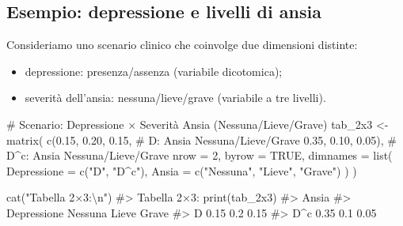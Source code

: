 \documentclass[
  letterpaper,
  DIV=11,
  numbers=noendperiod,
  oneside]{scrreprt}
\newenvironment{Shaded}{\begin{snugshade}}{\end{snugshade}}
\newcommand{\AttributeTok}[1]{\textcolor[rgb]{0.40,0.45,0.13}{#1}}
\newcommand{\CommentTok}[1]{\textcolor[rgb]{0.37,0.37,0.37}{#1}}
\newcommand{\ConstantTok}[1]{\textcolor[rgb]{0.56,0.35,0.01}{#1}}
\newcommand{\DecValTok}[1]{\textcolor[rgb]{0.68,0.00,0.00}{#1}}
\newcommand{\FloatTok}[1]{\textcolor[rgb]{0.68,0.00,0.00}{#1}}
\newcommand{\FunctionTok}[1]{\textcolor[rgb]{0.28,0.35,0.67}{#1}}
\newcommand{\NormalTok}[1]{\textcolor[rgb]{0.00,0.23,0.31}{#1}}
\newcommand{\OtherTok}[1]{\textcolor[rgb]{0.00,0.23,0.31}{#1}}
\newcommand{\SpecialCharTok}[1]{\textcolor[rgb]{0.37,0.37,0.37}{#1}}
\newcommand{\StringTok}[1]{\textcolor[rgb]{0.13,0.47,0.30}{#1}}
\providecommand{\tightlist}{%
  \setlength{\itemsep}{0pt}\setlength{\parskip}{0pt}}
\theoremstyle{definition}
\theoremstyle{plain}
\theoremstyle{definition}
\theoremstyle{remark}
\begin{document}
\subsection{Esempio: depressione e livelli di
ansia}\label{esempio-depressione-e-livelli-di-ansia}

Consideriamo uno scenario clinico che coinvolge due dimensioni distinte:

\begin{itemize}
\tightlist
\item
  depressione: presenza/assenza (variabile dicotomica);
\item
  severità dell'ansia: nessuna/lieve/grave (variabile a tre livelli).
\end{itemize}

\begin{Shaded}
\begin{Highlighting}[]
\CommentTok{\# Scenario: Depressione × Severità Ansia (Nessuna/Lieve/Grave)}
\NormalTok{tab\_2x3 }\OtherTok{\textless{}{-}} \FunctionTok{matrix}\NormalTok{(}
  \FunctionTok{c}\NormalTok{(}\FloatTok{0.15}\NormalTok{, }\FloatTok{0.20}\NormalTok{, }\FloatTok{0.15}\NormalTok{,  }\CommentTok{\# D: Ansia Nessuna/Lieve/Grave}
    \FloatTok{0.35}\NormalTok{, }\FloatTok{0.10}\NormalTok{, }\FloatTok{0.05}\NormalTok{), }\CommentTok{\# D\^{}c: Ansia Nessuna/Lieve/Grave}
  \AttributeTok{nrow =} \DecValTok{2}\NormalTok{, }\AttributeTok{byrow =} \ConstantTok{TRUE}\NormalTok{,}
  \AttributeTok{dimnames =} \FunctionTok{list}\NormalTok{(}
    \AttributeTok{Depressione =} \FunctionTok{c}\NormalTok{(}\StringTok{"D"}\NormalTok{, }\StringTok{"D\^{}c"}\NormalTok{),}
    \AttributeTok{Ansia =} \FunctionTok{c}\NormalTok{(}\StringTok{"Nessuna"}\NormalTok{, }\StringTok{"Lieve"}\NormalTok{, }\StringTok{"Grave"}\NormalTok{)}
\NormalTok{  )}
\NormalTok{)}

\FunctionTok{cat}\NormalTok{(}\StringTok{"Tabella 2×3:}\SpecialCharTok{\textbackslash{}n}\StringTok{"}\NormalTok{)}
\CommentTok{\#\textgreater{} Tabella 2×3:}
\FunctionTok{print}\NormalTok{(tab\_2x3)}
\CommentTok{\#\textgreater{}            Ansia}
\CommentTok{\#\textgreater{} Depressione Nessuna Lieve Grave}
\CommentTok{\#\textgreater{}         D      0.15   0.2  0.15}
\CommentTok{\#\textgreater{}         D\^{}c    0.35   0.1  0.05}
\end{Highlighting}
\end{Shaded}
\end{document}
